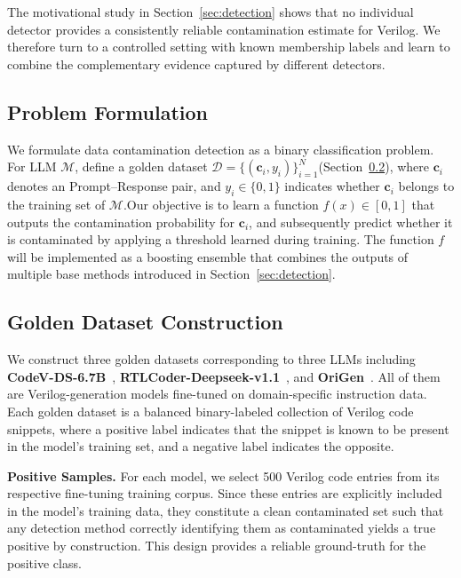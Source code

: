 The motivational study in Section~\ref{sec:detection} shows that no individual detector provides a consistently reliable contamination estimate for Verilog. We therefore turn to a controlled setting with known membership labels and learn to combine the complementary evidence captured by different detectors.

\subsection{Problem Formulation}
\label{sec:formulation}

We formulate data contamination detection as a binary classification problem. For LLM $\mathcal{M}$, define a golden dataset $\mathcal{D} = \{ (\mathbf{c}_i, y_i) \}_{i=1}^{N}$(Section~\ref{sec:golden_dataset}), where $\mathbf{c}_i$ denotes an Prompt--Response pair, and $y_i \in \{0, 1\}$ indicates whether $\mathbf{c}_i$ belongs to the training set of $\mathcal{M}$.Our objective is to learn a function $f(x) \in [0,1]$ that outputs the contamination probability for $\mathbf{c}_i$, and subsequently predict whether it is contaminated by applying a threshold learned during training. The function $f$ will be implemented as a boosting ensemble that combines the outputs of multiple base methods introduced in Section~\ref{sec:detection}.



\subsection{Golden Dataset Construction}
\label{sec:golden_dataset}

We construct three golden datasets corresponding to three LLMs including \textbf{CodeV-DS-6.7B}~\cite{zhao2024codev}, \textbf{RTLCoder-Deepseek-v1.1}~\cite{liu2024rtlcoder}, and \textbf{OriGen}~\cite{cui2024origen}. All of them are Verilog-generation models fine-tuned on domain-specific instruction data. Each golden dataset is a balanced binary-labeled collection of Verilog code snippets, where a positive label indicates that the snippet is known to be present in the model's training set, and a negative label indicates the opposite.

\textbf{Positive Samples.} For each model, we select 500 Verilog code entries from its respective fine-tuning training corpus. Since these entries are explicitly included in the model's training data, they constitute a clean contaminated set such that any detection method correctly identifying them as contaminated yields a true positive by construction. This design provides a reliable ground-truth for the positive class.


